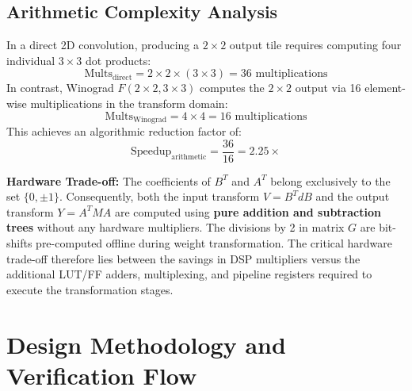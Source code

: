 \documentclass[12pt,a4paper]{article}
\begin{document}
\subsection{Arithmetic Complexity Analysis}
In a direct 2D convolution, producing a $2 \times 2$ output tile requires computing four individual $3 \times 3$ dot products:
\begin{equation}
    \text{Mults}_{\text{direct}} = 2 \times 2 \times (3 \times 3) = 36 \text{ multiplications}
\end{equation}
In contrast, Winograd $F(2 \times 2, 3 \times 3)$ computes the $2 \times 2$ output via 16 element-wise multiplications in the transform domain:
\begin{equation}
    \text{Mults}_{\text{Winograd}} = 4 \times 4 = 16 \text{ multiplications}
\end{equation}
This achieves an algorithmic reduction factor of:
\begin{equation}
    \text{Speedup}_{\text{arithmetic}} = \frac{36}{16} = 2.25\times
\end{equation}

\noindent\textbf{Hardware Trade-off:} The coefficients of $B^T$ and $A^T$ belong exclusively to the set $\{0, \pm 1\}$. Consequently, both the input transform $V = B^T d B$ and the output transform $Y = A^T M A$ are computed using \textbf{pure addition and subtraction trees} without any hardware multipliers. The divisions by 2 in matrix $G$ are bit-shifts pre-computed offline during weight transformation. The critical hardware trade-off therefore lies between the savings in DSP multipliers versus the additional LUT/FF adders, multiplexing, and pipeline registers required to execute the transformation stages.

\section{Design Methodology and Verification Flow}
\end{document}
